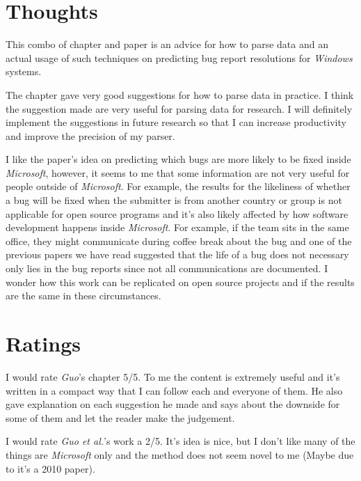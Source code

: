 \documentclass[sigconf]{acmart}
\begin{document}
\section{Thoughts}
This combo of chapter and paper is an advice for how to parse data and an actual usage of such techniques on predicting bug report resolutions for {\it Windows} systems.

The chapter gave very good suggestions for how to parse data in practice. I think the suggestion made are very useful for parsing data for research. I will definitely implement the suggestions in future research so that I can increase productivity and improve the precision of my parser. 

I like the paper's idea on predicting which bugs are more likely to be fixed inside {\it Microsoft}, however, it seems to me that some information are not very useful for people outside of {\it Microsoft}. For example, the results for the likeliness of whether a bug will be fixed when the submitter is from another country or group is not applicable for open source programs and it's also likely affected by how software development happens inside {\it Microsoft}. For example, if the team sits in the same office, they might communicate during coffee break about the bug and one of the previous papers we have read suggested that the life of a bug does not necessary only lies in the bug reports since not all communications are documented. I wonder how this work can be replicated on open source projects and if the results are the same in these circumstances.

\section{Ratings}
I would rate {\it Guo}'s chapter 5/5. To me the content is extremely useful and it's written in a compact way that I can follow each and everyone of them. He also gave explanation on each suggestion he made and says about the downside for some of them and let the reader make the judgement.

I would rate {\it Guo et al.}'s work a 2/5. It's idea is nice, but I don't like many of the things are {\it Microsoft} only and the method does not seem novel to me (Maybe due to it's a 2010 paper).
\end{document}

